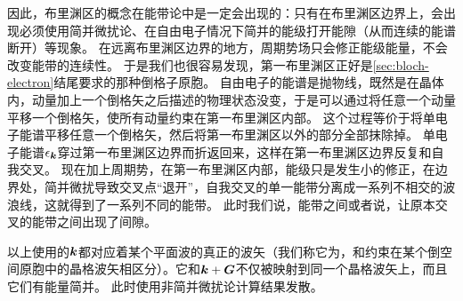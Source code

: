 因此，布里渊区的概念在能带论中是一定会出现的：只有在布里渊区边界上，会出现必须使用简并微扰论、在自由电子情况下简并的能级打开能隙（从而连续的能谱断开）等现象。
在远离布里渊区边界的地方，周期势场只会修正能级能量，不会改变能带的连续性。
于是我们也很容易发现，第一布里渊区正好是\autoref{sec:bloch-electron}结尾要求的那种倒格子原胞。
自由电子的能谱是抛物线，既然是在晶体内，动量加上一个倒格矢之后描述的物理状态没变，于是可以通过将任意一个动量平移一个倒格矢，使所有动量约束在第一布里渊区内部。
这个过程等价于将单电子能谱平移任意一个倒格矢，然后将第一布里渊区以外的部分全部抹除掉。
单电子能谱$\epsilon_{\vb*{k}}$穿过第一布里渊区边界而折返回来，这样在第一布里渊区边界反复和自我交叉。
现在加上周期势，在第一布里渊区内部，能级只是发生小的修正，在边界处，简并微扰导致交叉点“退开”，自我交叉的单一能带分离成一系列不相交的波浪线，这就得到了一系列不同的能带。
此时我们说，能带之间或者说，让原本交叉的能带之间出现了间隙。

以上使用的$\vb*{k}$都对应着某个平面波的真正的波矢（我们称它为，和约束在某个倒空间原胞中的晶格波矢相区分）。它和$\vb*{k} + \vb*{G}$不仅被映射到同一个晶格波矢上，而且它们有能量简并。
此时使用非简并微扰论计算结果发散。

